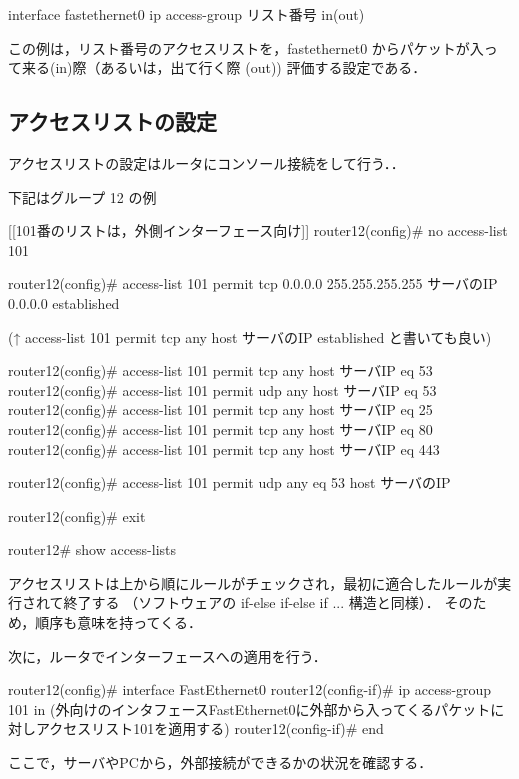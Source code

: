 \begin{cli}
interface fastethernet0
  ip access-group リスト番号 in(out)
\end{cli}

この例は，リスト番号のアクセスリストを，fastethernet0 からパケットが入っ
て来る(in)際（あるいは，出て行く際 (out)) 評価する設定である．

\subsection*{アクセスリストの設定}

アクセスリストの設定はルータにコンソール接続をして行う．．

\begin{cli}
下記はグループ 12 の例

[[101番のリストは，外側インターフェース向け]]
router12(config)# no access-list 101

router12(config)# access-list 101 permit tcp 0.0.0.0 255.255.255.255
サーバのIP 0.0.0.0 established

(↑ access-list 101 permit tcp any host サーバのIP established
 と書いても良い)

router12(config)# access-list 101 permit tcp any host サーバIP eq 53
router12(config)# access-list 101 permit udp any host サーバIP eq 53
router12(config)# access-list 101 permit tcp any host サーバIP eq 25
router12(config)# access-list 101 permit tcp any host サーバIP eq 80
router12(config)# access-list 101 permit tcp any host サーバIP eq 443

router12(config)# access-list 101 permit udp any eq 53 host サーバのIP

router12(config)# exit

router12# show access-lists
\end{cli}

アクセスリストは上から順にルールがチェックされ，最初に適合したルールが実行されて終了する
（ソフトウェアの if-else if-else if ... 構造と同様）．
そのため，順序も意味を持ってくる．

次に，ルータでインターフェースへの適用を行う．

\begin{cli}
router12(config)# interface FastEthernet0
router12(config-if)# ip access-group 101 in
                (外向けのインタフェースFastEthernet0に外部から入ってくるパケットに対しアクセスリスト101を適用する)
router12(config-if)# end
\end{cli}

ここで，サーバやPCから，外部接続ができるかの状況を確認する．

